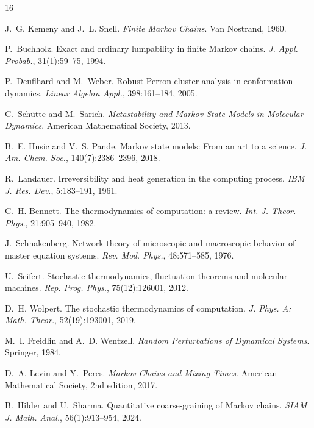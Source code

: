 \documentclass[11pt,a4paper]{article}
\theoremstyle{definition}
\theoremstyle{remark}
\begin{document}

\begin{thebibliography}{16}

J.~G. Kemeny and J.~L. Snell.
\emph{Finite Markov Chains}.
Van Nostrand, 1960.

P.~Buchholz.
Exact and ordinary lumpability in finite Markov chains.
\emph{J. Appl. Probab.}, 31(1):59--75, 1994.

P.~Deuflhard and M.~Weber.
Robust Perron cluster analysis in conformation dynamics.
\emph{Linear Algebra Appl.}, 398:161--184, 2005.

C.~Sch\"utte and M.~Sarich.
\emph{Metastability and Markov State Models in Molecular Dynamics}.
American Mathematical Society, 2013.

B.~E. Husic and V.~S. Pande.
Markov state models: From an art to a science.
\emph{J. Am. Chem. Soc.}, 140(7):2386--2396, 2018.

R.~Landauer.
Irreversibility and heat generation in the computing process.
\emph{IBM J. Res. Dev.}, 5:183--191, 1961.

C.~H. Bennett.
The thermodynamics of computation: a review.
\emph{Int. J. Theor. Phys.}, 21:905--940, 1982.

J.~Schnakenberg.
Network theory of microscopic and macroscopic behavior of master equation systems.
\emph{Rev. Mod. Phys.}, 48:571--585, 1976.

U.~Seifert.
Stochastic thermodynamics, fluctuation theorems and molecular machines.
\emph{Rep. Prog. Phys.}, 75(12):126001, 2012.

D.~H. Wolpert.
The stochastic thermodynamics of computation.
\emph{J. Phys. A: Math. Theor.}, 52(19):193001, 2019.

M.~I. Freidlin and A.~D. Wentzell.
\emph{Random Perturbations of Dynamical Systems}.
Springer, 1984.

D.~A. Levin and Y.~Peres.
\emph{Markov Chains and Mixing Times}.
American Mathematical Society, 2nd edition, 2017.

B.~Hilder and U.~Sharma.
Quantitative coarse-graining of Markov chains.
\emph{SIAM J. Math. Anal.}, 56(1):913--954, 2024.


\end{thebibliography}
\end{document}
